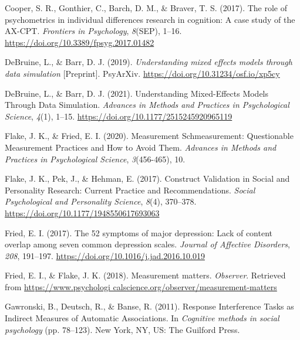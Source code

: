 \documentclass[
  man,floatsintext]{apa6}
\newlength{\cslhangindent}
\newlength{\cslentryspacingunit} %
\newenvironment{CSLReferences}[2] %
 {%
  \setlength{\parindent}{0pt}
  \ifodd #1
  \let\oldpar\par
  \def\par{\hangindent=\cslhangindent\oldpar}
  \fi
  \setlength{\parskip}{#2\cslentryspacingunit}
 }%
 {}
\begin{document}
\begin{CSLReferences}{1}{0}
\leavevmode{}%
Cooper, S. R., Gonthier, C., Barch, D. M., \& Braver, T. S. (2017). The role of psychometrics in individual differences research in cognition: {A} case study of the {AX}-{CPT}. \emph{Frontiers in Psychology}, \emph{8}(SEP), 1--16. \url{https://doi.org/10.3389/fpsyg.2017.01482}

\leavevmode{}%
DeBruine, L., \& Barr, D. J. (2019). \emph{Understanding mixed effects models through data simulation} {[}Preprint{]}. PsyArXiv. \url{https://doi.org/10.31234/osf.io/xp5cy}

\leavevmode{}%
DeBruine, L., \& Barr, D. J. (2021). Understanding {Mixed}-{Effects} {Models} {Through} {Data} {Simulation}. \emph{Advances in Methods and Practices in Psychological Science}, \emph{4}(1), 1--15. \url{https://doi.org/10.1177/2515245920965119}

\leavevmode{}%
Flake, J. K., \& Fried, E. I. (2020). Measurement {Schmeasurement}: {Questionable} {Measurement} {Practices} and {How} to {Avoid} {Them}. \emph{Advances in Methods and Practices in Psychological Science}, \emph{3}(456-465), 10.

\leavevmode{}%
Flake, J. K., Pek, J., \& Hehman, E. (2017). Construct {Validation} in {Social} and {Personality} {Research}: {Current} {Practice} and {Recommendations}. \emph{Social Psychological and Personality Science}, \emph{8}(4), 370--378. \url{https://doi.org/10.1177/1948550617693063}

\leavevmode{}%
Fried, E. I. (2017). The 52 symptoms of major depression: {Lack} of content overlap among seven common depression scales. \emph{Journal of Affective Disorders}, \emph{208}, 191--197. \url{https://doi.org/10.1016/j.jad.2016.10.019}

\leavevmode{}%
Fried, E. I., \& Flake, J. K. (2018). Measurement matters. \emph{Observer}. Retrieved from \href{https://www.psychologi\%20calscience.org/observer/measurement-matters}{https://www.psychologi calscience.org/observer/measurement-matters}

\leavevmode{}%
Gawronski, B., Deutsch, R., \& Banse, R. (2011). Response {Interference} {Tasks} as {Indirect} {Measures} of {Automatic} {Associations}. In \emph{Cognitive methods in social psychology} (pp. 78--123). New York, NY, US: The Guilford Press.


\end{CSLReferences}
\end{document}

